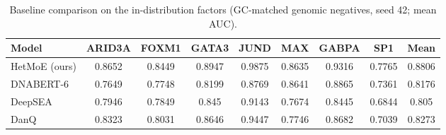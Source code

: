 \begin{table}[ht]\centering
\caption{Baseline comparison on the in-distribution factors (GC-matched genomic negatives, seed 42; mean AUC).}\label{tab:baseline_indist}
\begin{tabular}{lc c c c c c c c}
\hline
Model & ARID3A & FOXM1 & GATA3 & JUND & MAX & GABPA & SP1 & Mean \\
\hline
HetMoE (ours) & 0.8652 & 0.8449 & 0.8947 & 0.9875 & 0.8635 & 0.9316 & 0.7765 & 0.8806\\
DNABERT-6 & 0.7649 & 0.7748 & 0.8199 & 0.8769 & 0.8641 & 0.8865 & 0.7361 & 0.8176\\
DeepSEA & 0.7946 & 0.7849 & 0.845 & 0.9143 & 0.7674 & 0.8445 & 0.6844 & 0.805\\
DanQ & 0.8323 & 0.8031 & 0.8646 & 0.9447 & 0.7746 & 0.8682 & 0.7039 & 0.8273 \\
\hline
\end{tabular}\end{table}
